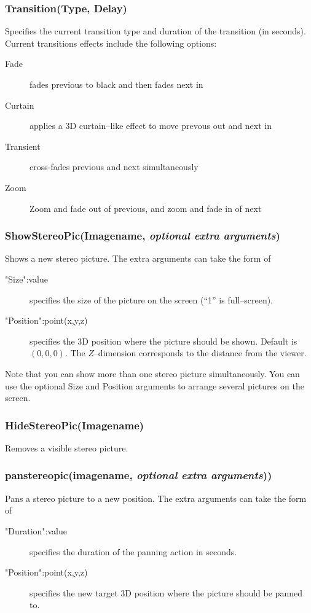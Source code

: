 \subsubsection{Transition(Type, Delay)}
Specifies the current transition type and duration of the transition (in seconds). Current transitions effects include the following options:
\begin{description}
\item[Fade] fades previous to black and then fades next in
\item[Curtain] applies a 3D curtain--like effect to move prevous out and next in
\item[Transient] cross-fades previous and next simultaneously
\item[Zoom] Zoom and fade out of previous, and zoom and fade in of next
\end{description}

\subsubsection{ShowStereoPic(Imagename, \textit{optional extra arguments})}
Shows a new stereo picture. The extra arguments can take the form of
\begin{description}
\item["Size":value] specifies the size of the picture on the screen (``1'' is full--screen).
\item["Position":point(x,y,z)] specifies the 3D position where the picture should be shown. Default is $(0,0,0)$. The $Z$--dimension corresponds to the distance from the viewer.
\end{description}
Note that you can show more than one stereo picture simultaneously. You can use the optional Size and Position arguments to arrange several pictures on the screen.

\subsubsection{HideStereoPic(Imagename)}
Removes a visible stereo picture.

\subsubsection{panstereopic(imagename, \textit{optional extra arguments}))}
Pans a stereo picture to a new position. The extra arguments can take the form of
\begin{description}
\item["Duration":value] specifies the duration of the panning action in seconds.
\item["Position":point(x,y,z)] specifies the new target 3D position where the picture should be panned to.
\end{description}

